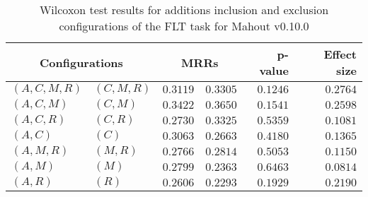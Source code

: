 
\begin{table}
\begin{spacing}{1.2}
\centering
\caption{Wilcoxon test results for additions inclusion and exclusion configurations of the FLT task for Mahout v0.10.0}
\label{table:versus-wilcox-mahout-flt-additions}
\begin{tabular}{ll|rr|rr}
\toprule
      \multicolumn{2}{c|}{Configurations} &          \multicolumn{2}{c|}{MRRs} &       p-value & Effect size \\
\midrule
 $(A,C,M,R)$ &  $(C,M,R)$ & $0.3119$ & $0.3305$ & $0.1246$ &    $0.2764$ \\
   $(A,C,M)$ &    $(C,M)$ & $0.3422$ & $0.3650$ & $0.1541$ &    $0.2598$ \\
   $(A,C,R)$ &    $(C,R)$ & $0.2730$ & $0.3325$ & $0.5359$ &    $0.1081$ \\
     $(A,C)$ &      $(C)$ & $0.3063$ & $0.2663$ & $0.4180$ &    $0.1365$ \\
   $(A,M,R)$ &    $(M,R)$ & $0.2766$ & $0.2814$ & $0.5053$ &    $0.1150$ \\
     $(A,M)$ &      $(M)$ & $0.2799$ & $0.2363$ & $0.6463$ &    $0.0814$ \\
     $(A,R)$ &      $(R)$ & $0.2606$ & $0.2293$ & $0.1929$ &    $0.2190$ \\
\bottomrule
\end{tabular}

\end{spacing}
\end{table}

